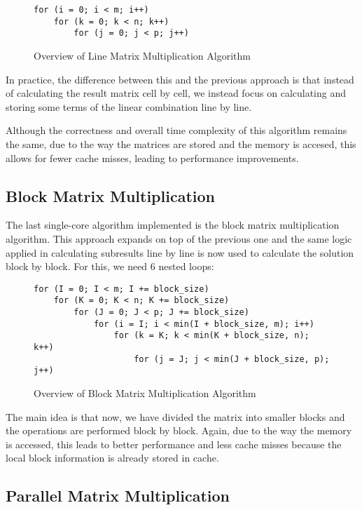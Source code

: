 \begin{figure}[h!]
\begin{verbatim}
for (i = 0; i < m; i++)
    for (k = 0; k < n; k++)
        for (j = 0; j < p; j++)
\end{verbatim}
\caption{Overview of Line Matrix Multiplication Algorithm}
\label{fig:algo:line}
\end{figure}

In practice, the difference between this and the previous approach is that instead of calculating the result matrix cell by cell, we instead focus on calculating and storing some terms of the linear combination line by line.

Although the correctness and overall time complexity of this algorithm remains the same, due to the way the matrices are stored and the memory is accesed, this allows for fewer cache misses, leading to performance improvements.

\subsection{Block Matrix Multiplication}

The last single-core algorithm implemented is the block matrix multiplication algorithm. This approach expands on top of the previous one and the same logic applied in calculating subresults line by line is now used to calculate the solution block by block. For this, we need 6 nested loops:

\begin{figure}[h!]
\begin{verbatim}
for (I = 0; I < m; I += block_size)
    for (K = 0; K < n; K += block_size)
        for (J = 0; J < p; J += block_size)
            for (i = I; i < min(I + block_size, m); i++)
                for (k = K; k < min(K + block_size, n); k++)
                    for (j = J; j < min(J + block_size, p); j++)
\end{verbatim}
\caption{Overview of Block Matrix Multiplication Algorithm}
\label{fig:algo:block}
\end{figure}

The main idea is that now, we have divided the matrix into smaller blocks and the operations are performed block by block. Again, due to the way the memory is accessed, this leads to better performance and less cache misses because the local block information is already stored in cache.

\subsection{Parallel Matrix Multiplication}

